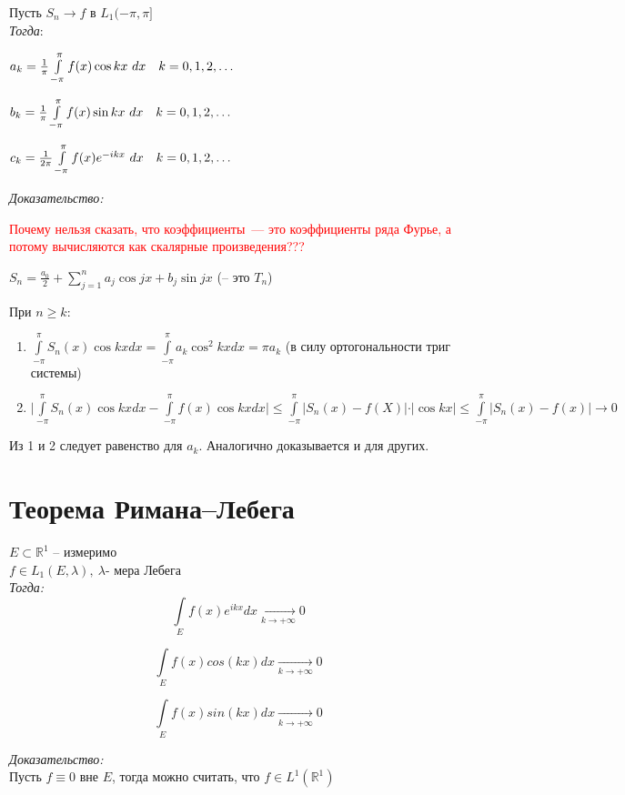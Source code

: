 \documentclass[paper=a4, fontsize=17pt]{article}
\begin{document}
Пусть $S_n \rightarrow f$ в $L_1(-\pi, \pi]$\\

\emph{Тогда}:

$a_k = \frac{1}{\pi}\int\limits_{-\pi}^{\pi}f(x)\cos kx\ dx \quad k = 0, 1, 2, \mathellipsis$

$b_k = \frac{1}{\pi}\int\limits_{-\pi}^{\pi}f(x)\sin kx\ dx \quad k = 0, 1, 2, \mathellipsis$

$c_k = \frac{1}{2\pi}\int\limits_{-\pi}^{\pi}f(x)e^{-ikx}\ dx \quad k = 0, 1, 2, \mathellipsis$


\emph{Доказательство:}

\textcolor{red}{Почему нельзя сказать, что коэффициенты~--- это коэффициенты ряда Фурье, а потому вычисляются как скалярные произведения???}

$S_n=\frac{a_0}2 + \sum\limits_{j=1}^n a_j \cos jx + b_j \sin jx$ (-- это $T_n$)

При $n \ge k:$

\begin{enumerate}
	\item
		$\int\limits_{-\pi}^{\pi} S_n(x) \cos kx dx = \int\limits_{-\pi}^{\pi} a_k \cos^2 kx dx = \pi a_k$
		(в силу ортогональности триг системы)
	\item
		$\vert \int\limits_{-\pi}^{\pi} S_n(x) \cos kx dx - \int\limits_{-\pi}^{\pi} f(x) \cos kx dx \vert \le \int\limits_{-\pi}^{\pi} \vert S_n(x)-f(X) \vert \cdot \vert \cos kx \vert \le \int\limits_{-\pi}^{\pi} \vert S_n(x) - f(x) \vert \rightarrow 0$
\end{enumerate}

Из 1 и 2 следует равенство для $a_k$. Аналогично доказывается и для других.

\section{Теорема Римана--Лебега}
$E \subset \mathds{R}^1$ -- измеримо\\ $f \in L_1(E, \lambda), ~ \lambda \text{- мера Лебега}$ \\
\emph{Тогда:}
$$\int\limits_{E}f(x)e^{ikx}dx \xrightarrow[k \to +\infty]{} 0$$

$$\int\limits_{E}f(x)cos(kx)dx \xrightarrow[k \to +\infty]{} 0$$

$$\int\limits_{E}f(x)sin(kx)dx \xrightarrow[k \to +\infty]{} 0$$

\emph{Доказательство:} \\
Пусть $f \equiv 0$ вне $E$, тогда можно считать, что $f \in L^1(\mathds{R}^1)$
\end{document}
